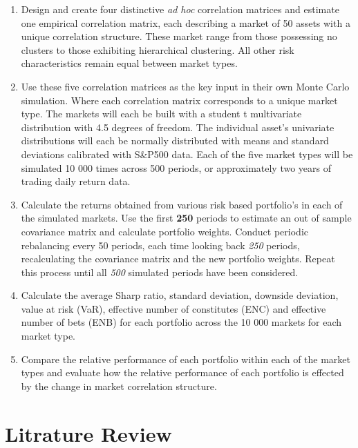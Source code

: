 \documentclass[11pt,preprint, authoryear]{elsarticle}
\numberwithin{equation}{section}
\numberwithin{figure}{section}
\numberwithin{table}{section}
\begin{document}
\begin{enumerate}
\def\labelenumi{\arabic{enumi}.}
\item
  Design and create four distinctive \emph{ad hoc} correlation matrices
  and estimate one empirical correlation matrix, each describing a
  market of 50 assets with a unique correlation structure. These market
  range from those possessing no clusters to those exhibiting
  hierarchical clustering. All other risk characteristics remain equal
  between market types.
\item
  Use these five correlation matrices as the key input in their own
  Monte Carlo simulation. Where each correlation matrix corresponds to a
  unique market type. The markets will each be built with a student t
  multivariate distribution with 4.5 degrees of freedom. The individual
  asset's univariate distributions will each be normally distributed
  with means and standard deviations calibrated with S\&P500 data. Each
  of the five market types will be simulated 10 000 times across 500
  periods, or approximately two years of trading daily return data.
\item
  Calculate the returns obtained from various risk based portfolio's in
  each of the simulated markets. Use the first \textbf{250} periods to
  estimate an out of sample covariance matrix and calculate portfolio
  weights. Conduct periodic rebalancing every 50 periods, each time
  looking back \emph{250} periods, recalculating the covariance matrix
  and the new portfolio weights. Repeat this process until all
  \emph{500} simulated periods have been considered.
\item
  Calculate the average Sharp ratio, standard deviation, downside
  deviation, value at risk (VaR), effective number of constitutes (ENC)
  and effective number of bets (ENB) for each portfolio across the 10
  000 markets for each market type.
\item
  Compare the relative performance of each portfolio within each of the
  market types and evaluate how the relative performance of each
  portfolio is effected by the change in market correlation structure.
\end{enumerate}

\hypertarget{litrature-review}{%
\section{\texorpdfstring{Litrature Review
\label{lit}}{Litrature Review }}\label{litrature-review}}
\end{document}
